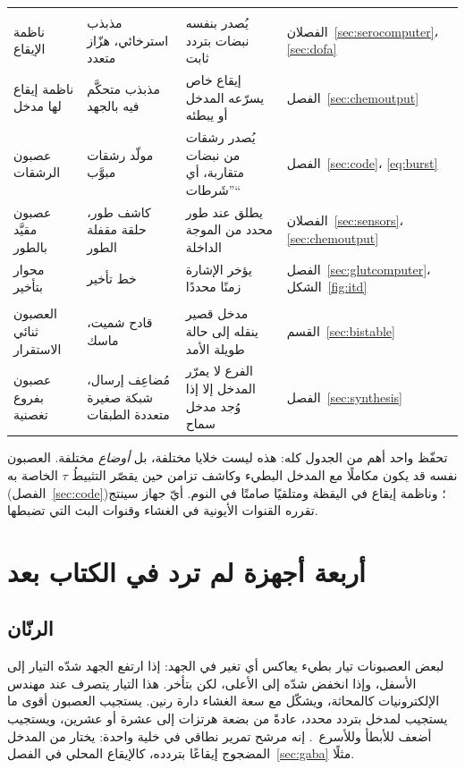 \begin{center}
\begin{longtable}{>{\raggedright}p{3.1cm}>{\raggedright}p{3.3cm}>{\raggedright}p{4.7cm}>{\raggedright\arraybackslash}p{2.4cm}}
\midrule
\multicolumn{4}{l}{\emph{المولّدات والزمن}} \\
ناظمة الإيقاع & مذبذب استرخائي، هزّاز متعدد & يُصدر بنفسه نبضات بتردد ثابت & الفصلان~\ref{sec:serocomputer}، \ref{sec:dofa} \\
ناظمة إيقاع لها مدخل & مذبذب متحكَّم فيه بالجهد & إيقاع خاص يسرّعه المدخل أو يبطئه & الفصل~\ref{sec:chemoutput} \\
عصبون الرشقات & مولّد رشقات مبوَّب & يُصدر رشقات من نبضات متقاربة، أي ”شَرطات“ & الفصل~\ref{sec:code}، \eqref{eq:burst} \\
عصبون مقيَّد بالطور & كاشف طور، حلقة مقفلة الطور & يطلق عند طور محدد من الموجة الداخلة & الفصلان~\ref{sec:sensors}، \ref{sec:chemoutput} \\
محوار بتأخير & خط تأخير & يؤخر الإشارة زمنًا محددًا & الفصل~\ref{sec:glutcomputer}، الشكل~\ref{fig:itd} \\
\midrule
\multicolumn{4}{l}{\emph{الذاكرة والتبديل}} \\
العصبون ثنائي الاستقرار & قادح شميت، ماسك & مدخل قصير ينقله إلى حالة طويلة الأمد & القسم~\ref{sec:bistable} \\
عصبون بفروع تغصنية & مُضاعِف إرسال، شبكة صغيرة متعددة الطبقات & الفرع لا يمرّر المدخل إلا إذا وُجد مدخل سماح & الفصل~\ref{sec:synthesis} \\
\end{longtable}
\end{center}

تحفّظ واحد أهم من الجدول كله: هذه ليست خلايا مختلفة، بل \emph{أوضاع} مختلفة. العصبون نفسه قد يكون مكاملًا مع المدخل البطيء وكاشف تزامن حين يقصّر التثبيطُ $\tau$ الخاصة به (الفصل~\ref{sec:code})؛ وناظمة إيقاع في اليقظة ومتلقيًا صامتًا في النوم. أيّ جهاز سينتج تقرره القنوات الأيونية في الغشاء وقنوات البث التي تضبطها.

\section{أربعة أجهزة لم ترد في الكتاب بعد}

\subsection{الرنّان}
\label{sec:resonator}

لبعض العصبونات تيار بطيء يعاكس أي تغير في الجهد: إذا ارتفع الجهد شدّه التيار إلى الأسفل، وإذا انخفض شدّه إلى الأعلى، لكن بتأخر. هذا التيار يتصرف عند مهندس الإلكترونيات كالمحاثة، ويشكّل مع سعة الغشاء دارة رنين. يستجيب العصبون أقوى ما يستجيب لمدخل بتردد محدد، عادةً من بضعة هرتزات إلى عشرة أو عشرين، ويستجيب أضعف للأبطأ وللأسرع~\cite{HutcheonYarom2000}. إنه مرشح تمرير نطاقي في خلية واحدة: يختار من المدخل المضجوج إيقاعًا بتردده، كالإيقاع المحلي في الفصل~\ref{sec:gaba} مثلًا.

